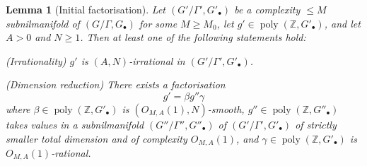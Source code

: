 \documentclass[11pt,reqno]{amsart}
\numberwithin{equation}{section}
\theoremstyle{plain}
\newtheorem{lemma}[subsection]{Lemma}
\theoremstyle{definition}
\renewcommand{\leq}{\leqslant}
\renewcommand{\geq}{\geqslant}
\newcommand\Z{\mathbb{Z}}
\newcommand\1{{\bf 1}}
\newcommand\2{{\bf 2}}
\newcommand\poly{\operatorname{poly}}
\begin{document}
\begin{lemma}[Initial factorisation]\label{init}  Let $(G'/\Gamma',G'_\bullet)$ be a complexity $\leq M$ subnilmanifold of $(G/\Gamma,G_\bullet)$ for some $M \geq M_0$, let $g' \in \poly(\Z, G'_\bullet)$, and let $A > 0$ and $N \geq 1$.  Then at least one of the following statements hold:

\textup{(}Irrationality\textup{)} $g'$ is $(A,N)$-irrational in $(G'/\Gamma',G'_\bullet)$.

\textup{(}Dimension reduction\textup{)}  There exists a factorisation
$$ g' = \beta g'' \gamma$$
where $\beta \in \poly(\Z,G'_\bullet)$ is $(O_{M,A}(1),N)$-smooth, $g'' \in \poly(\Z,G''_\bullet)$ takes values in a subnilmanifold $(G''/\Gamma'',G''_\bullet)$ of $(G'/\Gamma',G'_\bullet)$ of strictly smaller total dimension and of complexity $O_{M,A}(1)$, and $\gamma \in \poly(\Z,G'_\bullet)$ is $O_{M,A}(1)$-rational.
\end{lemma}
\end{document}
